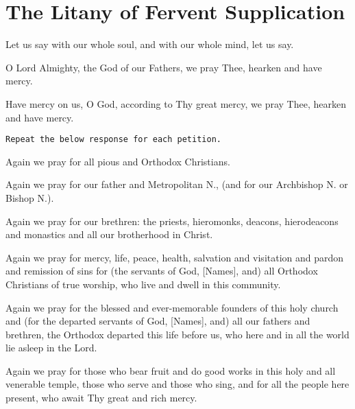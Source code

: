\documentclass[twoside, letterpaper, 12pt]{report}
\newcommand{\instruction}[1]{%
  \texttt{\scriptsize{#1}}%
}
\newcommand{\centeredsection}[1]{%
  \needspace{10\baselineskip}%
  \section*{\centering{}#1}%
}
\begin{document}
\centeredsection{The Litany of Fervent Supplication}
\begin{deacon}
\item Let us say with our whole soul, and with our whole mind, let us say.
\end{deacon}

\begin{deacon}
\item O Lord Almighty, the God of our Fathers, we pray Thee, hearken and have mercy.
\end{deacon}

\begin{deacon}
\item Have mercy on us, O God, according to Thy great mercy, we pray Thee, hearken
    and have mercy.
\end{deacon}

\instruction{Repeat the below response for each petition.}

\begin{deacon}
\item Again we pray for all pious and Orthodox Christians.
\item Again we pray for our father and Metropolitan N., (and for our Archbishop N. or Bishop N.).
\item Again we pray for our brethren: the priests, hieromonks, deacons, hierodeacons and monastics
    and all our brotherhood in Christ.
\item Again we pray for mercy, life, peace, health, salvation and visitation and pardon and
    remission of sins for (the servants of God, [Names], and) all Orthodox Christians of true
    worship, who live and dwell in this community.
\item Again we pray for the blessed and ever-memorable founders of this holy church and (for
    the departed servants of God, [Names], and) all our fathers and brethren, the Orthodox
    departed this life before us, who here and in all the world lie asleep in the Lord.
\item Again we pray for those who bear fruit and do good works in this holy and all venerable
    temple, those who serve and those who sing, and for all the people here present,
    who await Thy great and rich mercy.
\end{deacon}
\end{document}
